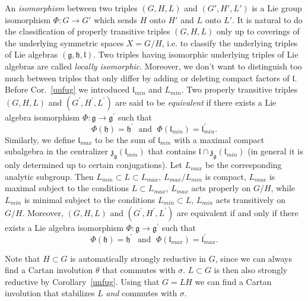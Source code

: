 \documentclass[10]{amsart}
\theoremstyle{remark}
\theoremstyle{definition}
\numberwithin{equation}{section}
\newcommand{\fg}{{\mathfrak g}}
\newcommand{\fh}{{\mathfrak h}}
\newcommand{\fl}{{\mathfrak l}}
\newcommand{\fz}{{\mathfrak z}}
\begin{document}
{An {\em isomorphism} between two triples $(G,H,L)$ and $(G',H',L')$ is a Lie group isomorphism $\Phi: G\rightarrow G'$ which sends $H$ onto $H'$ and $L$ onto $L'$.  It is natural to do the classification of properly transitive triples $(G,H,L)$  only up to coverings of the underlying symmetric spaces $X=G/H$, i.e. to classify
the underlying triples of Lie algebras $(\fg,\fh,\fl)$. Two triples having isomorphic underlying  triples of Lie algebras are called {\em locally isomorphic}. Moreover, we don't want to distinguish too much between triples that only differ by adding or deleting compact factors of $\fl$.
Before Cor.~\ref{unfug} we introduced $\fl_{min}$ and $L_{min}$. 
Two properly transitive triples $(G,H,L)$ and $(G^{\prime},H^{\prime},L^{\prime})$ are said to be {\em equivalent} if there exists a Lie 
algebra isomorphism $\Phi:\fg\longrightarrow\fg^{\prime}$ such that 
%
\begin{equation}\label{equiv}\nonumber
\Phi(\fh)=\fh^{\prime}\;\text{ and }\;\Phi(\fl_{min})=\fl^{\prime}_{min}.
\end{equation}
%
Similarly, we define $\fl_{max}$ to be the sum of $\fl_{min}$ with a maximal compact subalgebra in the centralizer $\fz_{\fg}(\fl_{min})$ that contains $\fl\cap\fz_{\fg}(\fl_{min})$ (in general it is only determined up to certain conjugations).  Let $L_{max}$ be the corresponding analytic subgroup. Then $L_{min}\subset L\subset L_{max}$, $L_{max}/L_{min}$ is compact, $L_{max}$
is maximal subject to the conditions $L\subset L_{max}$, $L_{max}$ acts properly on $G/H$, while $L_{min}$
is minimal subject to the conditions $L_{min}\subset L$, $L_{min}$ acts transitively on $G/H$. Moreover, $(G,H,L)$ and $(G^{\prime},H^{\prime},L^{\prime})$ are equivalent if and only if there exists a Lie 
algebra isomorphism $\Phi:\fg\longrightarrow\fg^{\prime}$ such that 
%
\begin{equation}\nonumber
\Phi(\fh)=\fh^{\prime}\;\text{ and }\;\Phi(\fl_{max})=\fl^{\prime}_{max}.
\end{equation}
%

Note that $H\subset G$ is automatically strongly reductive in $G$, since we can always find a Cartan involution $\theta$ that commutes with $\sigma$. $L\subset G$ is then also strongly
reductive by Corollary~\ref{unfug}.
Using that $G=LH$ we can find a Cartan involution that stabilizes $L$ {\it and} commutes with $\sigma$. 

}
\end{document}
